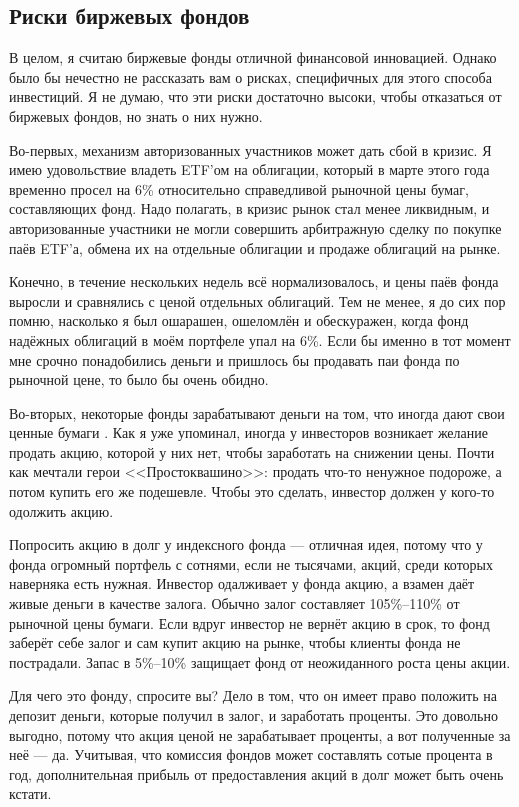 \subsection{Риски биржевых фондов}

В целом, я считаю биржевые фонды отличной финансовой инновацией. Однако было бы 
нечестно не рассказать вам о рисках, специфичных для этого способа инвестиций. Я 
не думаю, что эти риски достаточно высоки, чтобы отказаться от биржевых фондов, 
но знать о них нужно.

Во-первых, механизм авторизованных участников может дать сбой в кризис. Я имею 
удовольствие владеть ETF'ом на облигации, который в марте этого года временно 
просел на 6\% относительно справедливой рыночной цены бумаг, составляющих фонд. 
Надо полагать, в кризис рынок стал менее ликвидным, и авторизованные участники 
не могли совершить арбитражную сделку по покупке паёв ETF'а, обмена их на 
отдельные облигации и продаже облигаций на рынке.

Конечно, в течение нескольких недель всё нормализовалось, и цены паёв фонда 
выросли и сравнялись с ценой отдельных облигаций. Тем не менее, я до сих пор 
помню, насколько я был ошарашен, ошеломлён и обескуражен, когда фонд надёжных 
облигаций в моём портфеле упал на 6\%. Если бы именно в тот момент мне срочно 
понадобились деньги и пришлось бы продавать паи фонда по рыночной цене, то было 
бы очень обидно.

Во-вторых, некоторые фонды зарабатывают деньги на том, что иногда дают свои 
ценные бумаги . Как я уже упоминал, иногда у 
инвесторов возникает желание продать акцию, которой у них нет, чтобы заработать 
на снижении цены. Почти как мечтали герои <<Простоквашино>>: продать что-то 
ненужное подороже, а потом купить его же подешевле. Чтобы это сделать, инвестор 
должен у кого-то одолжить акцию.

Попросить акцию в долг у индексного фонда --- отличная идея, потому что у фонда 
огромный портфель с сотнями, если не тысячами, акций, среди которых наверняка 
есть нужная. Инвестор одалживает у фонда акцию, а взамен даёт живые деньги в 
качестве залога. Обычно залог составляет 105\%--110\% от рыночной цены бумаги. 
Если вдруг инвестор не вернёт акцию в срок, то фонд заберёт себе залог и сам 
купит акцию на рынке, чтобы клиенты фонда не пострадали. Запас в 5\%--10\% 
защищает фонд от неожиданного роста цены акции.

Для чего это фонду, спросите вы? Дело в том, что он имеет право положить на 
депозит деньги, которые получил в залог, и заработать проценты. Это довольно 
выгодно, потому что акция ценой  не зарабатывает проценты, а вот 
полученные за неё  --- да. Учитывая, что комиссия фондов может 
составлять сотые процента в год, дополнительная прибыль от предоставления акций 
в долг может быть очень кстати.

